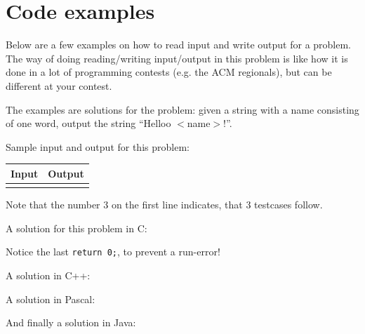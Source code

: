 \documentclass[11pt,a4paper]{article}
\begin{document}
\newpage
\appendix

\section{Code examples}\label{codeexamples}

Below are a few examples on how to read input and write output for a
problem. The way of doing reading/writing input/output in this problem
is like how it is done in a lot of programming contests (e.g. the ACM
regionals), but can be different at your contest.

The examples are solutions for the problem: given a string with a name
consisting of one word, output the string ``Helloo $<$name$>$!''.

Sample input and output for this problem:

\begin{tabular}{|p{}|p{}|}
\hline
\textbf{Input} & \textbf{Output} \\
\hline
 &
 \\
\hline
\end{tabular}

Note that the number 3 on the first line indicates, that 3 testcases
follow.

A solution for this problem in C:

Notice the last \texttt{return 0;}, to prevent a run-error!

\newpage

A solution in C++:

A solution in Pascal:

\newpage

And finally a solution in Java:
\end{document}
